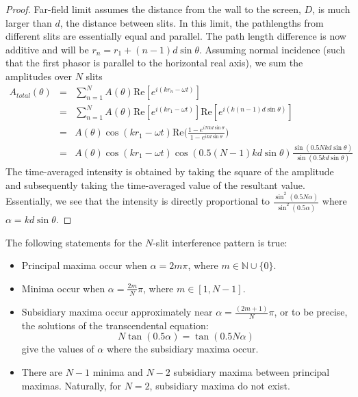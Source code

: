 \documentclass[a4paper]{article}
\begin{document}
\begin{proof}
Far-field limit assumes the distance from the wall to the screen, $D$, is much larger than $d$, the distance between slits. In this limit, the pathlengths from different slits are essentially equal and parallel. The path length difference is now additive and will be $r_n=r_1+(n-1)d\sin\theta$. Assuming normal incidence (such that the first phasor is parallel to the horizontal real axis), we sum the amplitudes over $N$ slits
\begin{eqnarray}
A_{total}(\theta)&=&\sum_{n=1}^NA(\theta)\text{Re}[e^{i(kr_n-\omega t)}]\nonumber\\&=&\sum_{n=1}^NA(\theta)\text{Re}[e^{i(kr_1-\omega t)}]\text{Re}[e^{i(k(n-1)d\sin\theta)}]\nonumber\\&=&A(\theta)\cos(kr_1-\omega t)\text{Re}\bigg(\frac{1-e^{iNkd\sin\theta}}{1-e^{ikd\sin\theta}}\bigg)\nonumber\\&=&A(\theta)\cos(kr_1-\omega t)\cos(0.5(N-1)kd\sin\theta)\frac{\sin(0.5Nkd\sin\theta)}{\sin(0.5kd\sin\theta)}\nonumber
\end{eqnarray}
The time-averaged intensity is obtained by taking the square of the amplitude and subsequently taking the time-averaged value of the resultant value. Essentially, we see that the intensity is directly proportional to $\frac{\sin^2(0.5N\alpha)}{\sin^2(0.5\alpha)}$ where $\alpha=kd\sin\theta$.
\end{proof}
\begin{cor}
The following statements for the $N$-slit interference pattern is true:
\begin{itemize}
\item Principal maxima occur when $\alpha=2m\pi$, where $m\in\mathbb{N}\cup\{0\}$. 
\item Minima occur when $\alpha=\frac{2m}{N}\pi$, where $m\in[1,N-1]$. 
\item Subsidiary maxima occur approximately near $\alpha=\frac{(2m+1)}{N}\pi$, or to be precise, the solutions of the transcendental equation:
$$N\tan(0.5\alpha)=\tan(0.5N\alpha)$$
give the values of $\alpha$ where the subsidiary maxima occur.
\item There are $N-1$ minima and $N-2$ subsidiary maxima between principal maximas. Naturally, for $N=2$, subsidiary maxima do not exist.
\end{itemize}
\end{cor}
\end{document}
